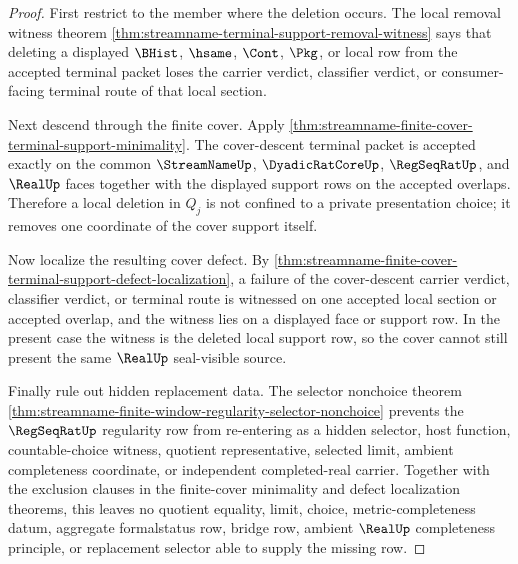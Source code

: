 \begin{proof}
First restrict to the member where the deletion occurs. The local removal
witness theorem
\autoref{thm:streamname-terminal-support-removal-witness} says that deleting a
displayed $\BHist$, $\hsame$, $\Cont$, $\Pkg$, or local \NameCert{} row from
the accepted terminal packet loses the carrier verdict, classifier verdict, or
consumer-facing terminal route of that local section.

Next descend through the finite cover. Apply
\autoref{thm:streamname-finite-cover-terminal-support-minimality}. The
cover-descent terminal packet is accepted exactly on the common
$\StreamNameUp$, $\DyadicRatCoreUp$, $\RegSeqRatUp$, and $\RealUp$ faces
together with the displayed support rows on the accepted overlaps. Therefore a
local deletion in $Q_j$ is not confined to a private presentation choice; it
removes one coordinate of the cover support itself.

Now localize the resulting cover defect. By
\autoref{thm:streamname-finite-cover-terminal-support-defect-localization}, a
failure of the cover-descent carrier verdict, classifier verdict, or terminal
route is witnessed on one accepted local section or accepted overlap, and the
witness lies on a displayed face or support row. In the present case the
witness is the deleted local support row, so the cover cannot still present the
same $\RealUp$ seal-visible source.

Finally rule out hidden replacement data. The selector nonchoice theorem
\autoref{thm:streamname-finite-window-regularity-selector-nonchoice} prevents
the $\RegSeqRatUp$ regularity row from re-entering as a hidden selector, host
function, countable-choice witness, quotient representative, selected limit,
ambient completeness coordinate, or independent completed-real carrier.
Together with the exclusion clauses in the finite-cover minimality and defect
localization theorems, this leaves no quotient equality, limit, choice,
metric-completeness datum, aggregate formalstatus row, bridge row, ambient
$\RealUp$ completeness principle, or replacement selector able to supply the
missing row.
\end{proof}

